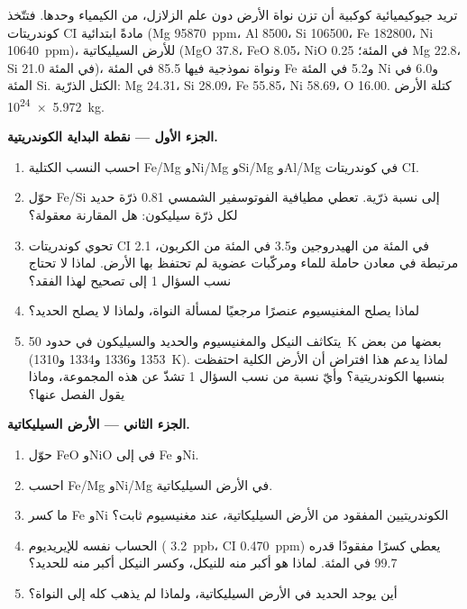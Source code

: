 \begin{problem}
\label{pb:b2:elements-in-the-earth:1}
تريد جيوكيميائية كوكبية أن تزن نواة الأرض دون علم الزلازل، من
الكيمياء وحدها. فتتّخذ كوندريتات CI مادةً ابتدائية (Mg
\qty{95870}{ppm}، Al 8500، Si \num{106500}، Fe \num{182800}، Ni
\qty{10640}{ppm})،  للأرض السيليكاتية (MgO 37.8، FeO
8.05، NiO 0.25 في المئة؛ Mg 22.8، Si 21.0 في المئة)، ونواة نموذجية فيها 85.5
في المئة Fe و5.2 في المئة Ni و6.0 في المئة Si. الكتل الذرّية: Mg 24.31،
Si 28.09، Fe 55.85، Ni 58.69، O 16.00. كتلة الأرض
\qty{5.972e24}{kg}.

\medskip\noindent\textbf{الجزء الأول --- نقطة البداية الكوندريتية.}
\begin{enumerate}
\item احسب النسب الكتلية Fe/Mg وNi/Mg وSi/Mg وAl/Mg في كوندريتات CI.
\item حوّل Fe/Si إلى نسبة ذرّية. تعطي مطيافية الفوتوسفير الشمسي
0.81 ذرّة حديد لكل ذرّة سيليكون: هل المقارنة معقولة؟
\item تحوي كوندريتات CI 2.1 في المئة من الهيدروجين و3.5 في المئة من الكربون، مرتبطة في
معادن حاملة للماء ومركّبات عضوية لم تحتفظ بها الأرض. لماذا
لا تحتاج نسب السؤال 1 إلى تصحيح لهذا الفقد؟
\item لماذا يصلح المغنيسيوم عنصرًا مرجعيًا لمسألة النواة،
ولماذا لا يصلح الحديد؟
\item يتكاثف النيكل والمغنيسيوم والحديد والسيليكون في حدود \qty{50}{K} بعضها من
بعض (1353 و1336 و1334 و\qty{1310}{K}). لماذا يدعم هذا
افتراض أن الأرض الكلية احتفظت بنسبها الكوندريتية؟ وأيّ نسبة من
نسب السؤال 1 تشذّ عن هذه المجموعة، وماذا يقول الفصل عنها؟
\end{enumerate}

\noindent\textbf{الجزء الثاني --- الأرض السيليكاتية.}
\begin{enumerate}[resume]
\item حوّل FeO وNiO في  إلى Fe وNi.
\item احسب Fe/Mg وNi/Mg في الأرض السيليكاتية.
\item ما كسر Fe وNi الكوندريتيين المفقود من الأرض
السيليكاتية، عند مغنيسيوم ثابت؟
\item الحساب نفسه للإيريديوم ( \qty{3.2}{ppb}، CI
\qty{0.470}{ppm}) يعطي كسرًا مفقودًا قدره 99.7 في المئة. لماذا هو أكبر
منه للنيكل، وكسر النيكل أكبر منه للحديد؟
\item أين يوجد الحديد في الأرض السيليكاتية، ولماذا لم يذهب كله إلى
النواة؟
\end{enumerate}


\end{problem}
